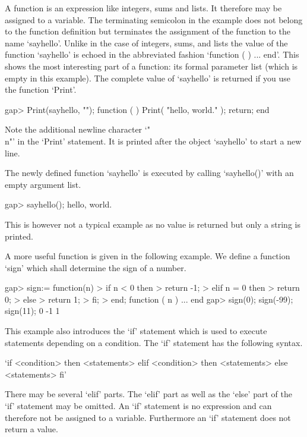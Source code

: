 A {\GAP}  function is an expression  like integers,  sums  and lists.  It
therefore  may be assigned to a  variable.   The terminating semicolon in
the example does not belong to the function definition but terminates the
assignment of the function to the name `sayhello'.  Unlike in the case of
integers, sums, and lists the value  of the function `sayhello' is echoed
in the abbreviated fashion `function ( )  ...  end'.  This shows the most
interesting part of a function: its formal parameter list (which is empty
in this example).  The  complete value of `sayhello'  is returned if  you
use the function `Print'.

\beginexample
    gap> Print(sayhello, "\n");
    function (  )
        Print( "hello, world.\n" );
        return;
    end
\endexample

Note the  additional newline character  `"\\n"' in the `Print' statement.
It is printed after the object `sayhello' to start a new line.

The newly defined function `sayhello' is executed by calling `sayhello()'
with an empty argument list.

\beginexample
    gap> sayhello();
    hello, world.
\endexample

This is however not a typical example as no  value is returned but only a
string is printed.

A  more useful function is given in the following  example.   We define a
function `sign' which shall determine the sign of a number.

\beginexample
    gap> sign:= function(n)
    >        if n < 0 then
    >           return -1;
    >        elif n = 0 then
    >           return 0;
    >        else
    >           return 1;
    >        fi;
    >    end;
    function ( n ) ... end
    gap> sign(0); sign(-99); sign(11);
    0
    -1
    1
\endexample

This example also introduces the `if' statement which is  used to execute
statements  depending  on  a  condition.   The  `if'  statement  has  the
following syntax.

\fmark`if <condition> then
    <statements>
elif <condition> then
    <statements>
else
    <statements>
fi'

There may be several `elif' parts.  The `elif' part as well as the `else'
part  of the  `if' statement may be omitted.   An  `if'  statement  is no
expression and  can therefore not be assigned to a variable.  Furthermore
an `if' statement does not return a value.

